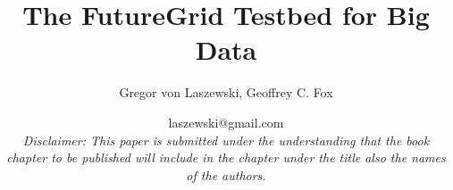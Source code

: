 \documentclass[graybox]{svmult}
\makeatletter
\newcommand{\TITLE}{The FutureGrid Testbed for Big Data}
\newcommand{\AUTHOR}{Gregor von Laszewski, Geoffrey C. Fox}
\newcommand{\EMAIL}{laszewski@gmail.com}
\newcommand{\DISCLAIMER}{{\em\footnotesize Disclaimer: This paper is submitted under the understanding that the book chapter to be published will include in the chapter under the title also the names of the authors.}}
\makeatother
\begin{document}
\title*{\TITLE}
\author{\AUTHOR}
\date{\EMAIL\\\DISCLAIMER}


















\maketitle



\newcommand{\ABSTRACT}{In this chapter we will be introducing FutureGrid, which provides a testbed to conduct research for Cloud, Grid, and High Performance Computing. Although FutureGrid has only a modest number of compute cores (about 4500 regular cores and 14000 GPU cores) it provides an ideal playground to test out various frameworks that may be useful for users to consider as part of their big data analysis pipelines. We will be focusing here on the use of FutureGrid for big data related testbed research.
%
The chapter is structured as follows. First we will provide the reader with an introduction to FutureGrid hardware (Section \ref{S:overview}).   Next we will focus on a selected number of services and tools that have been proven to be useful to conduct big data research on FutureGrid (Section \ref{S:services}). We will contrast frameworks such as MPI, virtual large memory systems, Infrastructure as a Service and map/reduce frameworks. Next we will present reasoning by analyzing requests to use certain technologies and identify trends within the user community to direct effort in FutureGrid (Section \ref{S:usage}). The next section will report on our experience with the integration of our software and systems teams via DevOps (Section \ref{S:devops}). Next we summarize Cloudmesh, which is a logical continuation of the FutureGrid architecture. It  provides abilities to federate cloud services and to conduct cloud shifting; that is to assign servers on-demand to HPC and Cloud services (Section \ref{S:cloudmesh}). We conclude the chapter with a brief summary (Section \ref{S:summary}).
}
\end{document}
